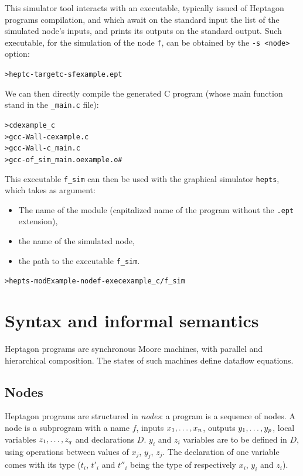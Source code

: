 \documentclass[a4paper]{article}
\begin{document}
This simulator tool interacts with an executable, typically issued of Heptagon
programs compilation, and which await on the standard input the list of the
simulated node's inputs, and prints its outputs on the standard output. Such
executable, for the simulation of the node \texttt{f}, can be obtained by the
\texttt{-s <node>} option:
\begin{alltt}
> heptc -target c -s f example.ept
\end{alltt}

We can then directly compile the generated C program (whose main function stand
in the \texttt{\_main.c} file):
\begin{alltt}
> cd example_c
> gcc -Wall -c example.c
> gcc -Wall -c _main.c
> gcc -o f_sim _main.o example.o       # 
\end{alltt}

This executable \texttt{f\_sim} can then be used with the graphical simulator
\texttt{hepts}, which takes as argument:
\begin{itemize}
\item The name of the module (capitalized name of the program without the
  \texttt{.ept} extension),
\item the name of the simulated node,
\item the path to the executable \texttt{f\_sim}.
\end{itemize}
\begin{alltt}
> hepts -mod Example -node f -exec example_c/f_sim
\end{alltt}

\section{Syntax and informal semantics}
\label{sec:synt-infor-sem}

Heptagon programs are synchronous Moore machines, with parallel and hierarchical
composition. The states of such machines define dataflow equations. 

\subsection{Nodes}
\label{sec:nodes}

Heptagon programs are structured in \emph{nodes}: a program is a sequence of
nodes. A node is a subprogram with a name $f$, inputs $\ton{x}{,}$, outputs
$\ton[1][p]{y}{,}$, local variables $\ton[1][q]{z}{,}$ and declarations
$D$. $y_i$ and $z_i$ variables are to be defined in $D$, using operations
between values of $x_j$, $y_j$, $z_j$. The declaration of one variable comes with its type
($t_i$, $t'_i$ and $t''_i$ being the type of respectively $x_i$, $y_i$ and
$z_i$).
\end{document}
